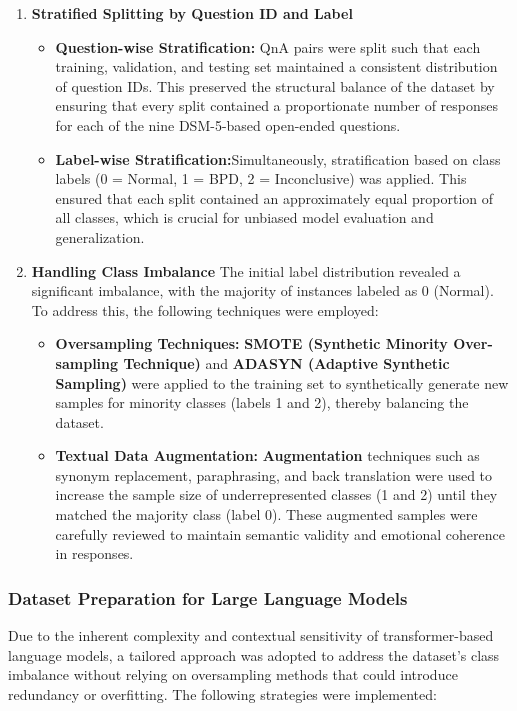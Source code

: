 \begin{enumerate}
    \item \textbf{Stratified Splitting by Question ID and Label}
    \begin{itemize}
        \item \textbf{Question-wise Stratification:} QnA pairs were split such that each training, validation, and testing set maintained a consistent distribution of question IDs. This preserved the structural balance of the dataset by ensuring that every split contained a proportionate number of responses for each of the nine DSM-5-based open-ended questions.

        \item \textbf{Label-wise Stratification:}Simultaneously, stratification based on class labels (0 = Normal, 1 = BPD, 2 = Inconclusive) was applied. This ensured that each split contained an approximately equal proportion of all classes, which is crucial for unbiased model evaluation and generalization.
    \end{itemize}
    \item \textbf{Handling Class Imbalance}
    The initial label distribution revealed a significant imbalance, with the majority of instances labeled as 0 (Normal). To address this, the following techniques were employed:
    \begin{itemize}
        \item \textbf{Oversampling Techniques:}
            \textbf{SMOTE (Synthetic Minority Over-sampling Technique)} and \textbf{ADASYN (Adaptive Synthetic Sampling)} were applied to the training set to synthetically generate new samples for minority classes (labels 1 and 2), thereby balancing the dataset.
        
        
        \item \textbf{Textual Data Augmentation:}
        \textbf{Augmentation} techniques such as synonym replacement, paraphrasing, and back translation were used to increase the sample size of underrepresented classes (1 and 2) until they matched the majority class (label 0).
        These augmented samples were carefully reviewed to maintain semantic validity and emotional coherence in responses.

    \end{itemize}
\end{enumerate}


\subsubsection{Dataset Preparation for Large Language Models}
Due to the inherent complexity and contextual sensitivity of transformer-based language models, a tailored approach was adopted to address the dataset’s class imbalance without relying on oversampling methods that could introduce redundancy or overfitting. The following strategies were implemented:

